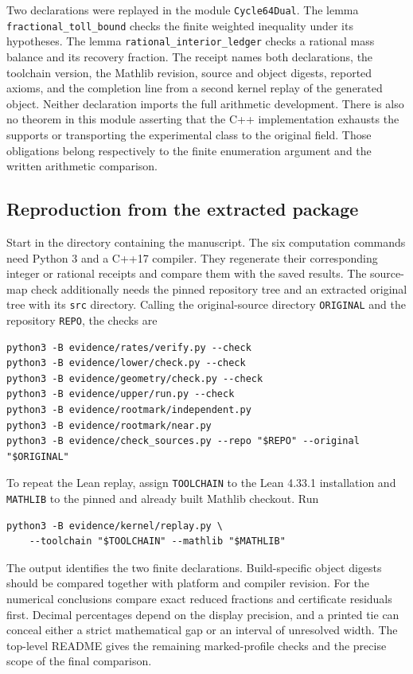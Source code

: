\begingroup\raggedright
Two declarations were replayed in the module \texttt{Cycle64Dual}. The lemma \texttt{fractional\_toll\_bound} checks the finite weighted inequality under its hypotheses. The lemma \texttt{rational\_interior\_ledger} checks a rational mass balance and its recovery fraction. The receipt names both declarations, the toolchain version, the Mathlib revision, source and object digests, reported axioms, and the completion line from a second kernel replay of the generated object. Neither declaration imports the full arithmetic development. There is also no theorem in this module asserting that the C++ implementation exhausts the supports or transporting the experimental class to the original field. Those obligations belong respectively to the finite enumeration argument and the written arithmetic comparison.\par\endgroup

\subsection{Reproduction from the extracted package}

Start in the directory containing the manuscript. The six computation commands need Python 3 and a C++17 compiler. They regenerate their corresponding integer or rational receipts and compare them with the saved results. The source-map check additionally needs the pinned repository tree and an extracted original tree with its \texttt{src} directory. Calling the original-source directory \texttt{ORIGINAL} and the repository \texttt{REPO}, the checks are
\begin{verbatim}
python3 -B evidence/rates/verify.py --check
python3 -B evidence/lower/check.py --check
python3 -B evidence/geometry/check.py --check
python3 -B evidence/upper/run.py --check
python3 -B evidence/rootmark/independent.py
python3 -B evidence/rootmark/near.py
python3 -B evidence/check_sources.py --repo "$REPO" --original "$ORIGINAL"
\end{verbatim}
To repeat the Lean replay, assign \texttt{TOOLCHAIN} to the Lean 4.33.1 installation and \texttt{MATHLIB} to the pinned and already built Mathlib checkout. Run
\begin{verbatim}
python3 -B evidence/kernel/replay.py \
    --toolchain "$TOOLCHAIN" --mathlib "$MATHLIB"
\end{verbatim}
The output identifies the two finite declarations. Build-specific object digests should be compared together with platform and compiler revision. For the numerical conclusions compare exact reduced fractions and certificate residuals first. Decimal percentages depend on the display precision, and a printed tie can conceal either a strict mathematical gap or an interval of unresolved width. The top-level README gives the remaining marked-profile checks and the precise scope of the final comparison.

